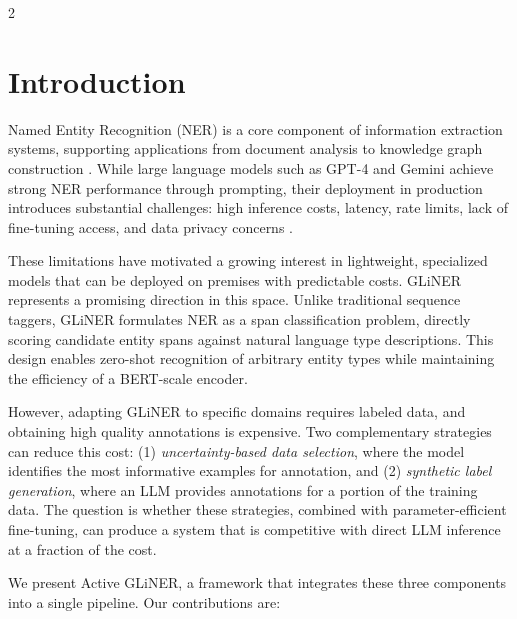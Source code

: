 \documentclass[11pt]{article}
\newcommand{\method}{Active GLiNER}
\begin{document}
\begin{multicols}{2}

\section{Introduction}

Named Entity Recognition (NER) is a core component of information extraction systems, supporting applications from document analysis to knowledge graph construction \citep{keraghel2024survey}. While large language models such as GPT-4 and Gemini achieve strong NER performance through prompting, their deployment in production introduces substantial challenges: high inference costs, latency, rate limits, lack of fine-tuning access, and data privacy concerns \citep{belcak2025small}.

These limitations have motivated a growing interest in lightweight, specialized models that can be deployed on premises with predictable costs. GLiNER \citep{zaratiana2023gliner} represents a promising direction in this space. Unlike traditional sequence taggers, GLiNER formulates NER as a span classification problem, directly scoring candidate entity spans against natural language type descriptions. This design enables zero-shot recognition of arbitrary entity types while maintaining the efficiency of a BERT-scale encoder.

However, adapting GLiNER to specific domains requires labeled data, and obtaining high quality annotations is expensive. Two complementary strategies can reduce this cost: (1) \emph{uncertainty-based data selection}, where the model identifies the most informative examples for annotation, and (2) \emph{synthetic label generation}, where an LLM provides annotations for a portion of the training data. The question is whether these strategies, combined with parameter-efficient fine-tuning, can produce a system that is competitive with direct LLM inference at a fraction of the cost.

We present \method{}, a framework that integrates these three components into a single pipeline. Our contributions are:


\end{multicols}
\end{document}
